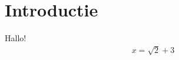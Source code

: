 \documentclass[a6paper]{article}
\begin{document}
    \section{Introductie}

    Hallo!
    \begin{align*}
        x = \sqrt{2} + 3
    \end{align*}
\end{document}

